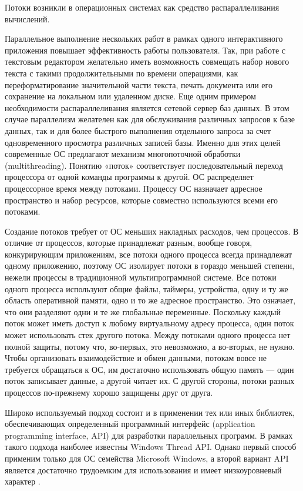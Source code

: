 \documentclass[12pt]{report}
\begin{document}
Потоки возникли в операционных системах как средство распараллеливания вычислений.

Параллельное выполнение нескольких работ в рамках одного интерактивного приложения повышает эффективность работы пользователя. Так, при работе с текстовым редактором желательно иметь возможность совмещать набор нового текста с такими продолжительными по времени операциями, как переформатирование значительной части текста, печать документа или его сохранение на локальном или удаленном диске. Еще одним примером необходимости распараллеливания является сетевой сервер баз данных. В этом случае параллелизм желателен как для обслуживания различных запросов к базе данных, так и для более быстрого выполнения отдельного запроса за счет одновременного просмотра различных записей базы. Именно для этих целей современные ОС предлагают механизм многопоточной обработки (multithreading). Понятию «поток» соответствует последовательный переход процессора от одной команды программы к другой. ОС распределяет процессорное время между потоками. Процессу ОС назначает адресное пространство и набор ресурсов, которые совместно используются всеми его потоками. 

Создание потоков требует от ОС меньших накладных расходов, чем процессов. В отличие от процессов, которые принадлежат разным, вообще говоря, конкурирующим приложениям, все потоки одного процесса всегда принадлежат одному приложению, поэтому ОС изолирует потоки в гораздо меньшей степени, нежели процессы в традиционной мультипрограммной системе. Все потоки одного процесса используют общие файлы, таймеры, устройства, одну и ту же область оперативной памяти, одно и то же адресное пространство. Это означает, что они разделяют одни и те же глобальные переменные. Поскольку каждый поток может иметь доступ к любому виртуальному адресу процесса, один поток может использовать стек другого потока. Между потоками одного процесса нет полной защиты, потому что, во-первых, это невозможно, а во-вторых, не нужно. Чтобы организовать взаимодействие и обмен данными, потокам вовсе не требуется обращаться к ОС, им достаточно использовать общую память — один поток записывает данные, а другой читает их. С другой стороны, потоки разных процессов по-прежнему хорошо защищены друг от друга.

Широко используемый подход состоит и в применении тех или иных библиотек, обеспечивающих определенный программный интерфейс (application programming interface, API) для разработки параллельных программ. В рамках такого подхода наиболее известны Windows Thread API. Однако первый способ применим только для ОС семейства Microsoft Windows, а второй вариант API является достаточно трудоемким для использования и имеет низкоуровневый характер \cite{Barkalov}.
\end{document}
